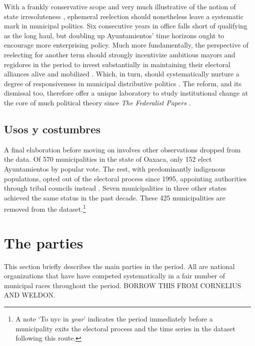 \documentclass[letter,12pt]{article}
\begin{document}
With a frankly conservative scope and very much illustrative of the notion of state irresoluteness \citep{cox.mccubbins.2001}, ephemeral reelection should nonetheless leave a systematic mark in municipal politics. Six consecutive years in office falls short of qualifying as the long haul, but doubling up Ayuntamientos' time horizons ought to encourage more enterprising policy. Much more fundamentally, the perspective of reelecting for another term should strongly incentivize ambitious mayors and regidores in the period to invest substantially in maintaining their electoral alliances alive and mobilized \citep{cain.etal.1987, motolinia-reel-pork2021}. Which, in turn, should systematically nurture a degree of responsiveness in municipal distributive politics \citep{cox.mccubbins.1986, jacobson.kernell.1983}. The reform, and its dismissal too, therefore offer a unique laboratory to study institutional change at the core of much political theory since \emph{The Federalist Papers} \citep{madison.etal.1788, mayhew.1974, schlesinger.1966, miller.hammond.1989}.

\subsection{Usos y costumbres}\label{S:uyc}

A final elaboration before moving on involves other observations dropped from the data. Of 570 municipalities in the state of Oaxaca, only 152 elect Ayuntamientos by popular vote. The rest, with predominantly indigenous populations, opted out of the electoral process since 1995, appointing authorities through tribal councils instead \citep[known as \emph{usos y costumbres} institutions, see][]{elizarraras.2002, eisenstadt.rios.uyc.2014}. Seven municipalities in three other states achieved the same status in the past decade. These 425 municipalities are removed from the dataset.\footnote{A note `To uyc in \emph{year}' indicates the period immediately before a municipality exits the electoral process and the time series in the dataset following this route.}

\section{The parties}

This section briefly describes the main parties in the period. All are national organizations that have have competed systematically in a fair number of municipal races throughout the period. BORROW THIS FROM CORNELIUS AND WELDON.
\end{document}
